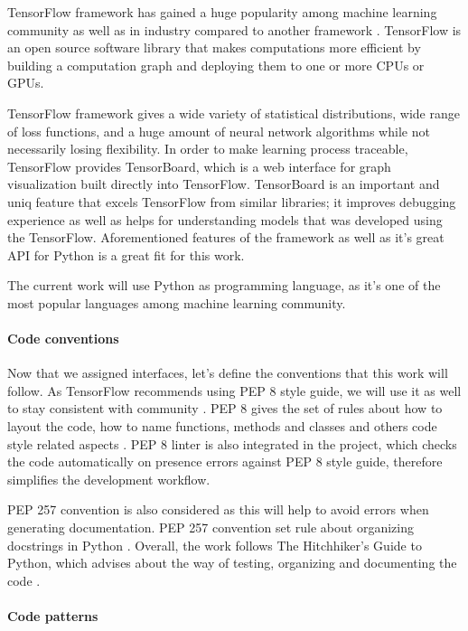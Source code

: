 TensorFlow framework has gained a huge popularity among machine learning
community as well as in industry compared to another framework \cite{DBLP:journals/corr/Goldsborough16}.
TensorFlow is an open source software library that makes computations more
efficient by building a computation graph and deploying them to one or more
CPUs or GPUs.


TensorFlow framework gives a wide variety of statistical distributions, wide
range of loss functions, and a huge amount of neural network algorithms while
not necessarily losing  flexibility. In order to make learning process traceable,
TensorFlow provides TensorBoard, which is a web interface for graph visualization
built directly into TensorFlow.
TensorBoard is an important and uniq feature that excels TensorFlow from similar
libraries; it improves debugging experience as well as helps
for understanding models that was developed using the TensorFlow.
Aforementioned features of the framework as well
as it's great API for Python is a great fit for this work.

The current work will use Python as programming language, as it's one of
the most popular languages among machine learning community.


\paragraph{Code conventions}
Now that we assigned interfaces, let's define the conventions that this work
will follow. As TensorFlow recommends using PEP 8 style guide, we will use it
as well to stay consistent
with community \cite{TfWeb}. PEP 8 gives the set of rules about how to layout
the code, how to name functions, methods and classes and others code style related
aspects \cite{Rossum}. PEP 8 linter is also integrated in the project, which checks the code
automatically on presence errors against PEP 8 style guide,
therefore simplifies the development workflow.

PEP 257 convention is also considered as this will help to avoid errors when
generating documentation. PEP 257 convention set rule about organizing
docstrings in Python \cite{Goodger2001}.
Overall, the work follows The Hitchhiker's Guide to Python, which advises
about the way of testing, organizing and documenting the code \cite{Reitz}.

\paragraph{Code patterns}

